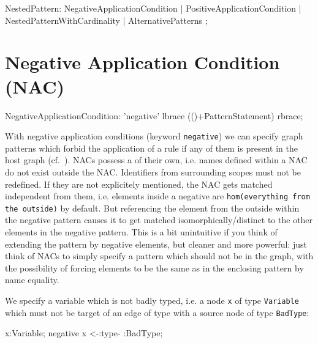\begin{rail}  
  NestedPattern: 
    NegativeApplicationCondition |
    PositiveApplicationCondition |
    NestedPatternWithCardinality |
    AlternativePatterns 
    ;
\end{rail}


\section{Negative Application Condition (NAC)}
\label{nac}

\begin{rail}  
  NegativeApplicationCondition: 
    'negative' lbrace (()+PatternStatement) rbrace;
\end{rail}

With negative application conditions (keyword \texttt{negative}) we can specify graph patterns which forbid the application of a rule if any of them is present in the host graph (cf.~\cite{adam}). 
NACs possess a  of their own, i.e. names defined within a NAC do not exist outside the NAC. 
Identifiers from surrounding scopes must not be redefined.
If they are not explicitely mentioned, the NAC gets matched independent from them, i.e. elements inside a negative are \texttt{hom(everything from the outside)} by default.
But referencing the element from the outside within the negative pattern causes it to get matched isomorphically/distinct to the other elements in the negative pattern. 
This is a bit unintuitive if you think of extending the pattern by negative elements, but cleaner and more powerful: 
just think of NACs to simply specify a pattern which should not be in the graph, with the possibility of forcing elements to be the same as in the enclosing pattern by name equality.

  \begin{example}
    We specify a variable which is not badly typed, i.e. a node \texttt{x} of type \texttt{Variable} which must not be target of an edge of type  with a source node of type \texttt{BadType}:
    \begin{grgen}
  x:Variable;
  negative {
    x <-:type- :BadType;
  }
    \end{grgen}
  \end{example}
 
